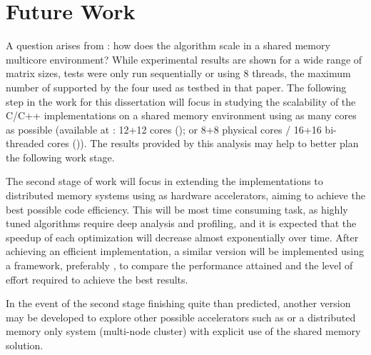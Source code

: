 \section{Future Work}
A question arises from \cite{Deadman:Higham:Ralha:2012}: how does the algorithm scale in a shared memory multicore environment? While experimental results are shown for a wide range of matrix sizes, tests were only run sequentially or using 8 threads, the maximum number of supported by the four \intel\xeon\cpus used as testbed in that paper. The following step in the work for this dissertation will focus in studying the scalability of the C/C++ implementations on a shared memory environment using as many cores as possible (available at \uminho: 12+12 cores (\amd); or 8+8 physical cores / 16+16 bi-threaded cores (\intel)). The results provided by this analysis may help to better plan the following work stage.

The second stage of work will focus in extending the implementations to distributed memory systems using \gpus as hardware accelerators, aiming to achieve the best possible code efficiency. This will be most time consuming task, as highly tuned algorithms require deep analysis and profiling, and it is expected that the speedup of each optimization will decrease almost exponentially over time. After achieving an efficient implementation, a similar version will be implemented using a framework, preferably \gama, to compare the performance attained and the level of effort required to achieve the best results.

In the event of the second stage finishing quite than predicted, another version may be developed to explore other possible accelerators such as \intel\mics or a distributed memory \cpu only system (multi-node cluster) with explicit use of the shared memory solution.
